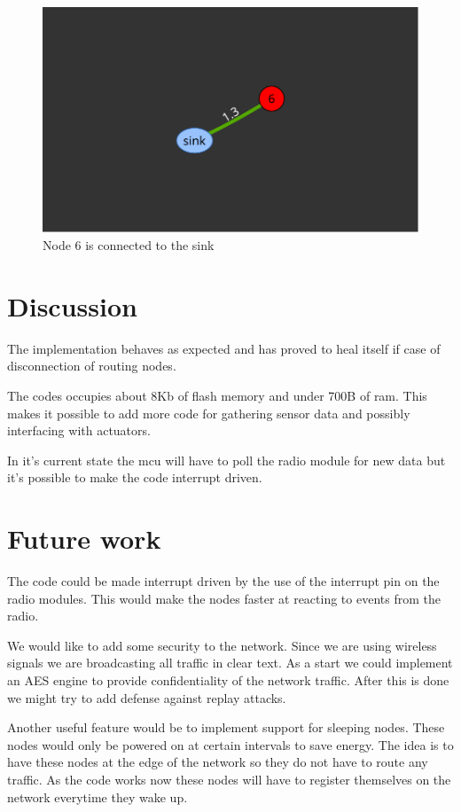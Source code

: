 \documentclass[a4paper,11pt]{article}
\begin{document}
\begin{figure}[H]
  \centering
  \includegraphics[width=.7\textwidth]{map.pdf}
  \caption{Node 6 is connected to the sink}
  \label{fig:web}
\end{figure}

\section{Discussion}
The implementation behaves as expected and has proved to heal itself
if case of disconnection of routing nodes.

The codes occupies about 8Kb of flash memory and under 700B of ram.
This makes it possible to add more code for gathering sensor data and
possibly interfacing with actuators.

In it's current state the mcu will have to poll the radio module for
new data but it's possible to make the code interrupt driven.

\section{Future work}
The code could be made interrupt driven by the use of the interrupt
pin on the radio modules. This would make the nodes faster at reacting
to events from the radio.

We would like to add some security to the network. Since we are using
wireless signals we are broadcasting all traffic in clear text. As a
start we could implement an AES engine to provide confidentiality of
the network traffic. After this is done we might try to add defense
against replay attacks.

Another useful feature would be to implement support for sleeping
nodes. These nodes would only be powered on at certain intervals to
save energy. The idea is to have these nodes at the edge of the
network so they do not have to route any traffic. As the code works
now these nodes will have to register themselves on the network
everytime they wake up.
\end{document}
